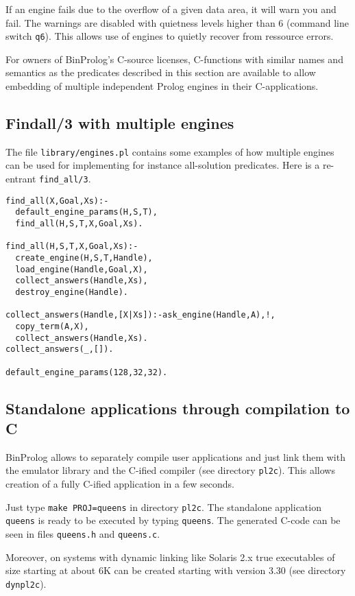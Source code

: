 \documentclass{article}
\begin{document}
If an engine fails due to the overflow of a given data area,
it will warn you and fail. The warnings are disabled with
quietness levels higher than 6 (command line switch {\tt \-q6}).
This allows use of engines to quietly recover from ressource
errors.

For owners of BinProlog's C-source licenses, C-functions
with similar names and semantics as the predicates
described in this section are available
to allow embedding of multiple independent
Prolog engines in their C-applications.

\subsection{Findall/3 with multiple engines}

The file {\tt library/engines.pl} contains some examples
of how multiple engines can be used for implementing
for instance all-solution predicates. Here is a re-entrant
{\tt find\_all/3}.

\begin{verbatim}
find_all(X,Goal,Xs):-
  default_engine_params(H,S,T),
  find_all(H,S,T,X,Goal,Xs).

find_all(H,S,T,X,Goal,Xs):-
  create_engine(H,S,T,Handle),
  load_engine(Handle,Goal,X),
  collect_answers(Handle,Xs),
  destroy_engine(Handle).

collect_answers(Handle,[X|Xs]):-ask_engine(Handle,A),!,
  copy_term(A,X),
  collect_answers(Handle,Xs).
collect_answers(_,[]).

default_engine_params(128,32,32).
\end{verbatim}

\subsection{Standalone applications through compilation to C}

BinProlog allows to separately compile user
applications and just link them with the emulator library and the
C-ified compiler (see directory {\tt pl2c}).  This allows creation of
a fully C-ified application in a few seconds. 

Just type {\tt make PROJ=queens} in directory {\tt pl2c}.
The standalone application {\tt queens} is ready to be executed
by typing {\tt queens}.
The generated C-code can be seen in files
{\tt queens.h} and {\tt queens.c}.

Moreover, on systems with dynamic linking like Solaris 2.x 
true executables of size starting at about 6K can be created starting
with version 3.30 (see directory {\tt dynpl2c}).
\end{document}
